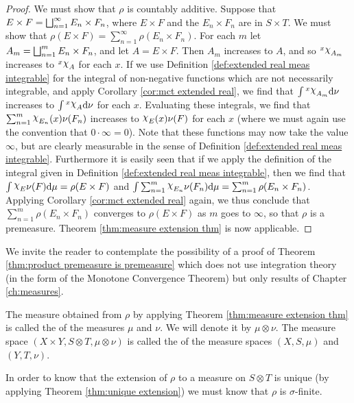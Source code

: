 \begin{proof}
We must show that $\rho$ is countably additive. Suppose that $E\times F=\bigsqcup_{n=1}^\infty E_n\times F_n$, where $E\times F$ and the $E_n\times F_n$ are in $S\times T$. We must show that $\rho(E\times F)=\sum_{n=1}^\infty\rho(E_n\times F_n)$. For each $m$ let $A_m=\bigsqcup_{n=1}^mE_n\times F_n$, and let $A=E\times F$. Then $A_m$ increases to $A$, and so $\xsec{\idf{A_m}}{x}$ increases to $\xsec{\idf{A}}{x}$ for each $x$. If we use Definition \ref{def:extended real meas integrable} for the integral of non-negative functions which are not necessarily integrable, and apply Corollary \ref{cor:mct extended real}, we find that $\int\xsec{\idf{A_m}}{x}\dd\nu$ increases to $\int\xsec{\idf{A}}{x}\dd\nu$ for each $x$. Evaluating these integrals, we find that $\sum_{n=1}^m\idf{E_n}(x)\nu(F_n)$ increases to $\idf{E}(x)\nu(F)$ for each $x$ (where we must again use the convention that $0\cdot\infty=0$). Note that these functions may now take the value $\infty$, but are clearly measurable in the sense of Definition \ref{def:extended real meas integrable}. Furthermore it is easily seen that if we apply the definition of the integral given in Definition \ref{def:extended real meas integrable}, then we find that $\int\idf{E}\nu(F)\dd\mu=\rho(E\times F)$ and $\int\sum_{n=1}^m\idf{E_n}\nu(F_n)\dd\mu=\sum_{n=1}^m\rho(E_n\times F_n)$. Applying Corollary \ref{cor:mct extended real} again, we thus conclude that $\sum_{n=1}^m\rho(E_n\times F_n)$ converges to $\rho(E\times F)$ as $m$ goes to $\infty$, so that $\rho$ is a premeasure. Theorem \ref{thm:measure extension thm} is now applicable.
\end{proof}

We invite the reader to contemplate the possibility of a proof of Theorem \ref{thm:product premeasure is premeasure} which does not use integration theory (in the form of the Monotone Convergence Theorem) but only results of Chapter \ref{ch:measures}.

\begin{definition}
The measure obtained from $\rho$ by applying Theorem \ref{thm:measure extension thm} is called the  of the measures $\mu$ and $\nu$. We will denote it by $\mu\otimes\nu$. The measure space $(X\times Y, S\otimes T,\mu\otimes\nu)$ is called the  of the measure spaces $(X,S,\mu)$ and $(Y,T,\nu)$.
\end{definition}

In order to know that the extension of $\rho$ to a measure on $S\otimes T$ is unique (by applying Theorem \ref{thm:unique extension}) we must know that $\rho$ is $\sigma$-finite.

